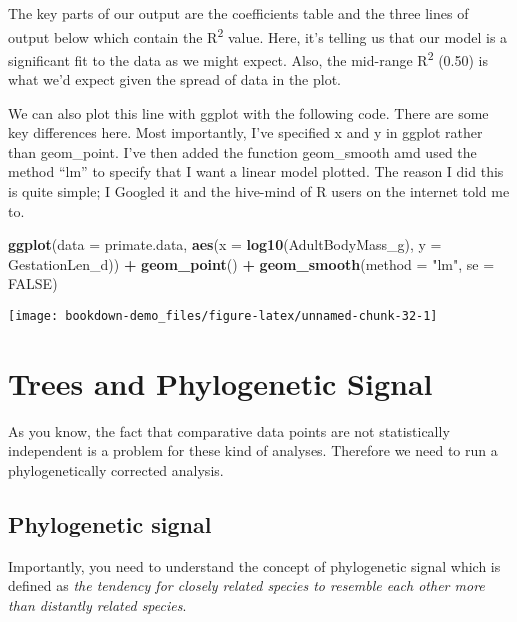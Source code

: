\documentclass[]{book}
\newenvironment{Shaded}{\begin{snugshade}}{\end{snugshade}}
\newcommand{\KeywordTok}[1]{\textcolor[rgb]{0.13,0.29,0.53}{\textbf{#1}}}
\newcommand{\DataTypeTok}[1]{\textcolor[rgb]{0.13,0.29,0.53}{#1}}
\newcommand{\StringTok}[1]{\textcolor[rgb]{0.31,0.60,0.02}{#1}}
\newcommand{\OtherTok}[1]{\textcolor[rgb]{0.56,0.35,0.01}{#1}}
\newcommand{\OperatorTok}[1]{\textcolor[rgb]{0.81,0.36,0.00}{\textbf{#1}}}
\newcommand{\NormalTok}[1]{#1}
\begin{document}
The key parts of our output are the coefficients table and the three
lines of output below which contain the R\textsuperscript{2} value.
Here, it's telling us that our model is a significant fit to the data as
we might expect. Also, the mid-range R\textsuperscript{2} (0.50) is what
we'd expect given the spread of data in the plot.

We can also plot this line with ggplot with the following code. There
are some key differences here. Most importantly, I've specified x and y
in ggplot rather than geom\_point. I've then added the function
geom\_smooth amd used the method ``lm'' to specify that I want a linear
model plotted. The reason I did this is quite simple; I Googled it and
the hive-mind of R users on the internet told me to.

\begin{Shaded}
\begin{Highlighting}[]
\KeywordTok{ggplot}\NormalTok{(}\DataTypeTok{data =}\NormalTok{ primate.data, }\KeywordTok{aes}\NormalTok{(}\DataTypeTok{x =} \KeywordTok{log10}\NormalTok{(AdultBodyMass_g), }\DataTypeTok{y =}\NormalTok{ GestationLen_d)) }\OperatorTok{+}
\StringTok{  }\KeywordTok{geom_point}\NormalTok{() }\OperatorTok{+}\StringTok{ }
\StringTok{  }\KeywordTok{geom_smooth}\NormalTok{(}\DataTypeTok{method =} \StringTok{"lm"}\NormalTok{, }\DataTypeTok{se =} \OtherTok{FALSE}\NormalTok{)}
\end{Highlighting}
\end{Shaded}

\begin{center}\texttt{[image: bookdown-demo\_files/figure-latex/unnamed-chunk-32-1]} \end{center}

\section{Trees and Phylogenetic
Signal}\label{trees-and-phylogenetic-signal}

As you know, the fact that comparative data points are not statistically
independent is a problem for these kind of analyses. Therefore we need
to run a phylogenetically corrected analysis.

\subsection{Phylogenetic signal}\label{phylogenetic-signal}

Importantly, you need to understand the concept of phylogenetic signal
which is defined as \emph{the tendency for closely related species to
resemble each other more than distantly related species}.
\end{document}
